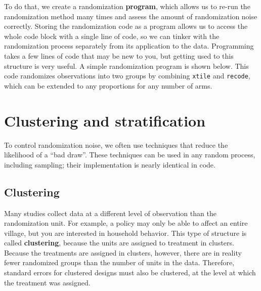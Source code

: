To do that, we create a randomization \textbf{program}, which
allows us to re-run the randomization method many times
and assess the amount of randomization noise correctly.
Storing the randomization code as a program allows us to access the whole code block
with a single line of code, so we can tinker with the randomization process
separately from its application to the data.
Programming takes a few lines of code that may be new to you,
but getting used to this structure is very useful.
A simple randomization program is shown below.
This code randomizes observations into two groups by combining
\texttt{xtile} and \texttt{recode},
which can be extended to any proportions for any number of arms.


\section{Clustering and stratification}

To control randomization noise, we often use techniques
that reduce the likelihood of a ``bad draw''.\cite{athey2017econometrics}
These techniques can be used in any random process,
including sampling; their implementation is nearly identical in code.

\subsection{Clustering}

Many studies collect data at a different level of observation than the randomization unit.
For example, a policy may only be able to affect an entire village,
but you are interested in household behavior.
This type of structure is called \textbf{clustering},
because the units are assigned to treatment in clusters.
Because the treatments are assigned in clusters, however,
there are in reality fewer randomized groups than the number of units in the data.
Therefore, standard errors for clustered designs must also be clustered,
at the level at which the treatment was assigned.

